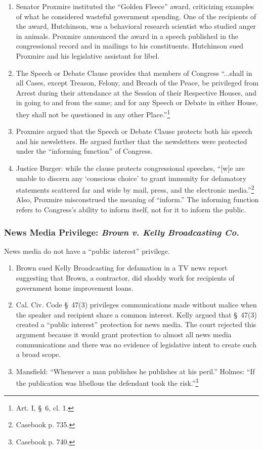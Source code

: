 \begin{enumerate}
    \item Senator Proxmire instituted the ``Golden Fleece'' award, criticizing 
    examples of what he considered wasteful government spending. One of the 
    recipients of the award, Hutchinson, was a behavioral research scientist 
    who studied anger in animals. Proxmire announced the award in a speech 
    published in the congressional record and in mailings to his constituents. 
    Hutchinson sued Proxmire and his legislative assistant for libel.
    \item The Speech or Debate Clause provides that members of Congress 
    ``...shall in all Cases, except Treason, Felony, and Breach of the Peace, 
    be privileged from Arrest during their attendance at the Session of their 
    Respective Houses, and in going to and from the same; and for any Speech 
    or Debate in either House, they shall not be questioned in any other 
    Place.''\footnote{Art. I, \S\ 6, cl. 1.}
    \item Proxmire argued that the Speech or Debate Clause protects both his 
    speech and his newsletters. He argued further that the newsletters were 
    protected under the ``informing function'' of Congress.
    \item Justice Burger: while the clause protects congressional speeches, 
    ``[w]e are unable to discern any `conscious choice' to grant immunity for 
    defamatory statements scattered far and wide by mail, press, and the 
    electronic media.''\footnote{Casebook p. 735.} Also, Proxmire misconstrued 
    the meaning of ``inform.'' The informing function refers to Congress's 
    ability to inform itself, not for it to inform the public.
\end{enumerate}

\subsubsection{News Media Privilege: \emph{Brown v. Kelly Broadcasting Co.}}

News media do not have a ``public interest'' privilege.

\begin{enumerate}
    \item Brown sued Kelly Broadcasting for defamation in a TV news report 
    suggesting that Brown, a contractor, did shoddy work for recipients of 
    government home improvement loans.
    \item Cal. Civ. Code \S\ 47(3) privileges communications made without 
    malice when the speaker and recipient share a common interest. Kelly 
    argued that \S\ 47(3) created a ``public interest'' protection for news 
    media. The court rejected this argument because it would grant protection 
    to almost all news media communications and there was no evidence of 
    legislative intent to create such a broad scope.
    \item Mansfield: ``Whenever a man publishes he publishes at his peril.'' 
    Holmes: ``If the publication was libellous the defendant took the 
    risk.''\footnote{Casebook p. 740.}
\end{enumerate}
